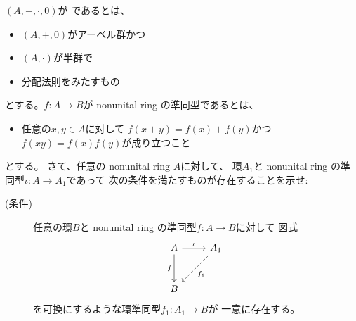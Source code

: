 \documentclass[report]{jlreq}
\begin{document}
\begin{problem}[代数学II 1.8]
    $(A, +, \cdot, 0)$が
     であるとは、
    \begin{itemize}
        \item $(A, +, 0)$がアーベル群かつ
        \item $(A, \cdot)$が半群で
        \item 分配法則をみたすもの
    \end{itemize}
    とする。$f \colon A \to B$が nonunital ring の準同型であるとは、
    \begin{itemize}
        \item 任意の$x, y \in A$に対して
            $f(x + y) = f(x) + f(y)$かつ
            $f(xy) = f(x) f(y)$が成り立つこと
    \end{itemize}
    とする。
    さて、任意の nonunital ring $A$に対して、
    環$A_1$と nonunital ring の準同型$\iota \colon A \to A_1$であって
    次の条件を満たすものが存在することを示せ:
    \begin{description}
        \item[(条件)]
            任意の環$B$と nonunital ring の準同型$f \colon A \to B$に対して
            図式
            \begin{equation}
                \begin{tikzcd}[row sep=large]
                    A \ar{d}[swap]{f} \ar{r}{\iota}
                        & A_1 \ar[dashed]{ld}{f_1} \\
                    B
                \end{tikzcd}
            \end{equation}
            を可換にするような環準同型$f_1 \colon A_1 \to B$が
            一意に存在する。
    \end{description}
\end{problem}

\begin{answer}
    \TODO{}
\end{answer}


\end{document}

